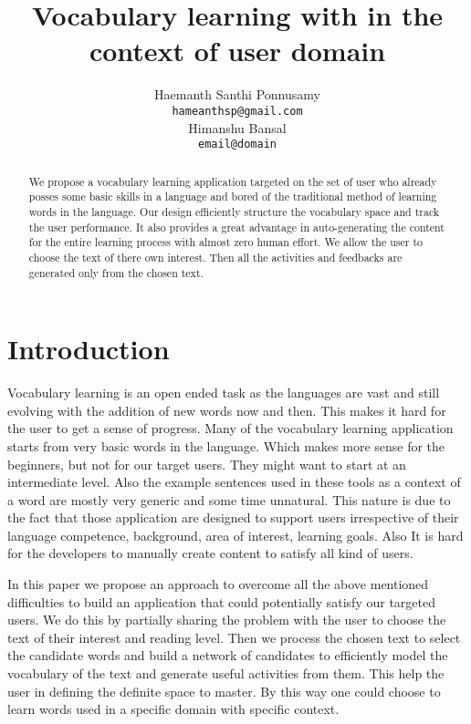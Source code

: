 \documentclass[11pt,a4paper]{article}
\title{Vocabulary learning with in the context of user domain}
\author{Haemanth Santhi Ponnusamy \\
  {\tt hameanthsp@gmail.com} \\\And
  Himanshu Bansal \\
  {\tt email@domain}}
\date{}
\begin{document}
\maketitle
\begin{abstract}
  We propose a vocabulary learning application targeted on the set of user
  who already posses some basic skills in a language and bored of the
  traditional method of learning words in the language. Our design 
  efficiently structure the vocabulary space and track the user performance.
  It also provides a great advantage in auto-generating the content
  for the entire learning process with almost zero human effort. We allow the
  user to choose the text of there own interest. Then all the activities and
  feedbacks are generated only from the chosen text.

\end{abstract}

\section{Introduction}
Vocabulary learning is an open ended task as the languages are vast and still
evolving with the addition of new words now and then. This makes it hard for the
user to get a sense of progress. Many of the vocabulary learning application 
starts from very basic words in the language. Which makes more sense for the 
beginners, but not for our target users. They might want to start at an
intermediate level. Also the example sentences used in these tools as a context
of a word are mostly very generic and some time unnatural. This nature is due to the
fact that those application are designed to support users irrespective of their
language competence, background, area of interest, learning goals. Also It is
hard for the developers to manually create content to satisfy all kind of users.

In this paper we propose an approach to overcome all the above mentioned
difficulties to build an application that could potentially satisfy our targeted
users. We do this by partially sharing the problem with the user to choose the 
text of their interest and reading level. Then we process the chosen text to
select the candidate words and build a network of candidates to efficiently model
the vocabulary of the text and generate useful activities from them. This help
the user in defining the definite space to master. By this way one
could choose to learn words used in a specific domain with specific context.
\end{document}
